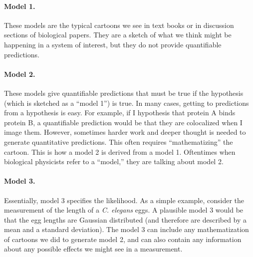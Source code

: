 \paragraph{Model 1.}  These models are the typical cartoons we see in
text books or in discussion sections of biological papers.  They are a
sketch of what we think might be happening in a system of interest,
but they do not provide quantifiable predictions.

\paragraph{Model 2.} These models give quantifiable predictions that
must be true if the hypothesis (which is sketched as a ``model 1'') is
true. In many cases, getting to predictions from a hypothesis is easy.
For example, if I hypothesis that protein A binds protein B, a
quantifiable prediction would be that they are colocalized when I
image them.  However, sometimes harder work and deeper thought is
needed to generate quantitative predictions.  This often requires
``mathematizing'' the cartoon.  This is how a model 2 is derived from
a model 1.  Oftentimes when biological physicists refer to a
``model,'' they are talking about model 2.

\paragraph{Model 3.} Essentially, model 3 specifies the likelihood.
As a simple example, consider the measurement of the length of a
\textit{C. elegans} eggs.  A plausible model 3 would be that the egg
lengths are Gaussian distributed (and therefore are described by a
mean and a standard deviation).  The model 3 can include any
mathematization of cartoons we did to generate model 2, and can also
contain any information about any possible effects we might see in a
measurement.


